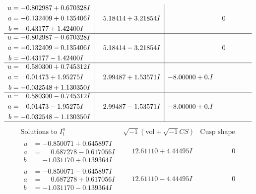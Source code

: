 \documentclass[1p]{elsarticle_modified}
\theoremstyle{definition}
\newcommand{\I}{\sqrt{-1}}
\begin{document}
$$\begin{array}{c|c|c}
\begin{aligned}
u &= -0.802987 + 0.670328 I \\
a &= -0.132409 + 0.135406 I \\
b &= -0.43177 + 1.42400 I\end{aligned}
 & \phantom{-}5.18414 + 3.21854 I & \phantom{-0.000000 } 0 \\ \hline\begin{aligned}
u &= -0.802987 - 0.670328 I \\
a &= -0.132409 - 0.135406 I \\
b &= -0.43177 - 1.42400 I\end{aligned}
 & \phantom{-}5.18414 - 3.21854 I & \phantom{-0.000000 } 0 \\ \hline\begin{aligned}
u &= \phantom{-}0.580300 + 0.745312 I \\
a &= \phantom{-}0.01473 + 1.95275 I \\
b &= -0.032548 + 1.130350 I\end{aligned}
 & \phantom{-}2.99487 + 1.53571 I & -8.00000 + 0. I\phantom{ +0.000000I} \\ \hline\begin{aligned}
u &= \phantom{-}0.580300 - 0.745312 I \\
a &= \phantom{-}0.01473 - 1.95275 I \\
b &= -0.032548 - 1.130350 I\end{aligned}
 & \phantom{-}2.99487 - 1.53571 I & -8.00000 + 0. I\phantom{ +0.000000I}\\
 \hline 
 \end{array}$$\newpage$$\begin{array}{c|c|c}  
\text{Solutions to }I^u_{1}& \I (\text{vol} + \sqrt{-1}CS) & \text{Cusp shape}\\
 \hline 
\begin{aligned}
u &= -0.850071 + 0.645897 I \\
a &= \phantom{-}0.687278 - 0.617056 I \\
b &= -1.031170 + 0.139364 I\end{aligned}
 & \phantom{-}12.61110 + 4.44495 I & \phantom{-0.000000 } 0 \\ \hline\begin{aligned}
u &= -0.850071 - 0.645897 I \\
a &= \phantom{-}0.687278 + 0.617056 I \\
b &= -1.031170 - 0.139364 I\end{aligned}
 & \phantom{-}12.61110 - 4.44495 I & \phantom{-0.000000 } 0 \\ \hline\begin{aligned}

\end{aligned}
\end{array}$$
\end{document}
